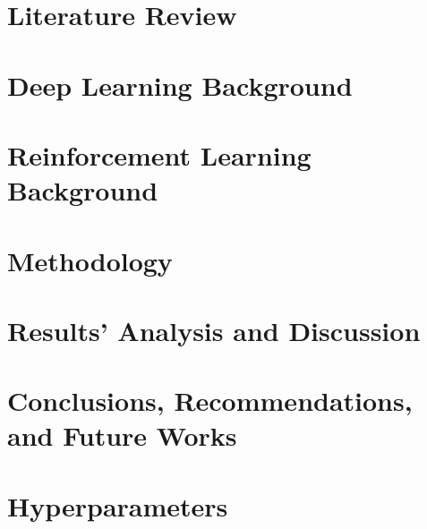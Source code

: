 \documentclass[tg, eng]{ita}    %
\begin{document}
\chapter{Literature Review}\label{ch:soccer3d}


\chapter{Deep Learning Background}\label{ch:deeplearning}


\chapter{Reinforcement Learning Background}\label{ch:reinforcementlearning}


\chapter{Methodology}\label{ch:methodology}


\chapter{Results' Analysis and Discussion}\label{ch:results}


\chapter{Conclusions, Recommendations, and Future Works}\label{ch:conclusion}


\renewcommand\bibname{\itareferencesnamebabel} %


\appendix
\chapter{Hyperparameters}\label{ap:hyperparameters} %


%

\end{document}
